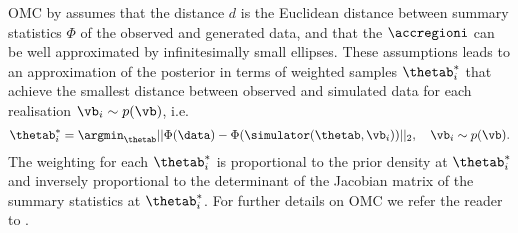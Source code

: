 OMC by \citet{Meeds2015} assumes that the distance $d$ is the
Euclidean distance between summary statistics $\Phi$ of the observed
and generated data, and that the $\accregioni$ can be well
approximated by infinitesimally small ellipses. These assumptions
leads to an approximation of the posterior in terms of weighted
samples $\thetab_i^*$ that achieve the smallest distance between
observed and simulated data for each realisation $\vb_i \sim p(\vb)$,
i.e.\
\begin{equation} \label{eq:omc_opt_prob}
\thetab_i^* = \argmin_{\thetab} ||\Phi(\data)-\Phi(\simulator(\thetab, \vb_i))||_2  , \quad \vb_i \sim p(\vb).
\end{equation}
The weighting for each $\thetab_i^*$ is proportional to the prior
density at $\thetab_i^*$ and inversely proportional to the determinant
of the Jacobian matrix of the summary statistics at $\thetab_i^*$. For
further details on OMC we refer the reader to \citep{Meeds2015,
  Ikonomov2019}.

